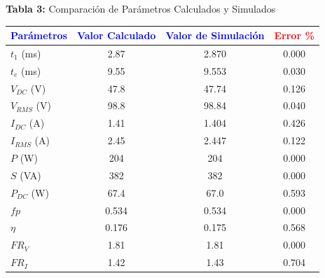 \documentclass[11pt]{article}
\begin{document}
\begin{center}
\textbf{Tabla 3:} Comparaci\'on de Par\'ametros Calculados y Simulados

\medskip
\begin{tabular}{|l|c|c|c|}
\hline
\textbf{\textcolor{blue}{Par\'ametros}} & \textbf{\textcolor{blue}{Valor Calculado}} & \textbf{\textcolor{blue}{Valor de Simulaci\'on}} & \textbf{\textcolor{red}{Error \%}} \\ \hline
$t_1$ (ms) & 2.87 & 2.870 & 0.000 \\
$t_e$ (ms) & 9.55 & 9.553 & 0.030 \\
$V_{DC}$ (V) & 47.8 & 47.74 & 0.126 \\
$V_{RMS}$ (V) & 98.8 & 98.84 & 0.040 \\
$I_{DC}$ (A) & 1.41 & 1.404 & 0.426 \\
$I_{RMS}$ (A) & 2.45 & 2.447 & 0.122 \\
$P$ (W) & 204 & 204 & 0.000 \\
$S$ (VA) & 382 & 382 & 0.000 \\
$P_{DC}$ (W) & 67.4 & 67.0 & 0.593 \\
$fp$ & 0.534 & 0.534 & 0.000 \\
$\eta$ & 0.176 & 0.175 & 0.568 \\
$FR_V$ & 1.81 & 1.81 & 0.000 \\
$FR_I$ & 1.42 & 1.43 & 0.704 \\ \hline
\end{tabular}
\end{center}
\end{document}
